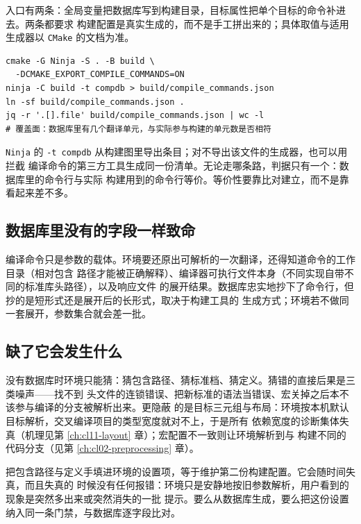 \documentclass[12pt,a4paper,fontset=fandol]{ctexbook}
\newcommand{\Tool}[1]{\texttt{#1}}
\newcommand{\Sw}[1]{\texttt{#1}}
\begin{document}
入口有两条：全局变量把数据库写到构建目录，目标属性把单个目标的命令补进去。两条都要求
构建配置是真实生成的，而不是手工拼出来的；具体取值与适用生成器以 \Tool{CMake} 的文档为准。

\begin{lstlisting}[style=shellstyle, caption={取数据库并据此做一次与构建等价的解析（示意）}]
cmake -G Ninja -S . -B build \
  -DCMAKE_EXPORT_COMPILE_COMMANDS=ON
ninja -C build -t compdb > build/compile_commands.json
ln -sf build/compile_commands.json .
jq -r '.[].file' build/compile_commands.json | wc -l
# 覆盖面：数据库里有几个翻译单元，与实际参与构建的单元数是否相符
\end{lstlisting}

\Tool{Ninja} 的 \Sw{-t compdb} 从构建图里导出条目；对不导出该文件的生成器，也可以用拦截
编译命令的第三方工具生成同一份清单。无论走哪条路，判据只有一个：数据库里的命令行与实际
构建用到的命令行等价。等价性要靠比对建立，而不是靠看起来差不多。

\subsection{数据库里没有的字段一样致命}\label{sec:cl14-compdb-fields}

编译命令只是参数的载体。环境要还原出可解析的一次翻译，还得知道命令的工作目录（相对包含
路径才能被正确解释）、编译器可执行文件本身（不同实现自带不同的标准库头路径），以及响应文件
的展开结果。数据库忠实地抄下了命令行，但抄的是短形式还是展开后的长形式，取决于构建工具的
生成方式；环境若不做同一套展开，参数集合就会差一批。

\subsection{缺了它会发生什么}\label{sec:cl14-compdb-missing}

没有数据库时环境只能猜：猜包含路径、猜标准档、猜定义。猜错的直接后果是三类噪声——找不到
头文件的连锁错误、把新标准的语法当错误、宏关掉之后本不该参与编译的分支被解析出来。更隐蔽
的是目标三元组与布局：环境按本机默认目标解析，交叉编译项目的类型宽度就对不上，于是所有
依赖宽度的诊断集体失真（机理见第 \ref{ch:cl11-layout} 章）；宏配置不一致则让环境解析到与
构建不同的代码分支（见第 \ref{ch:cl02-preprocessing} 章）。

\begin{warning}[title={环境自带的默认参数不是构建参数}]
把包含路径与定义手填进环境的设置项，等于维护第二份构建配置。它会随时间失真，而且失真的
时候没有任何报错：环境只是安静地按旧参数解析，用户看到的现象是突然多出来或突然消失的一批
提示。要么从数据库生成，要么把这份设置纳入同一条门禁，与数据库逐字段比对。
\end{warning}
\end{document}
